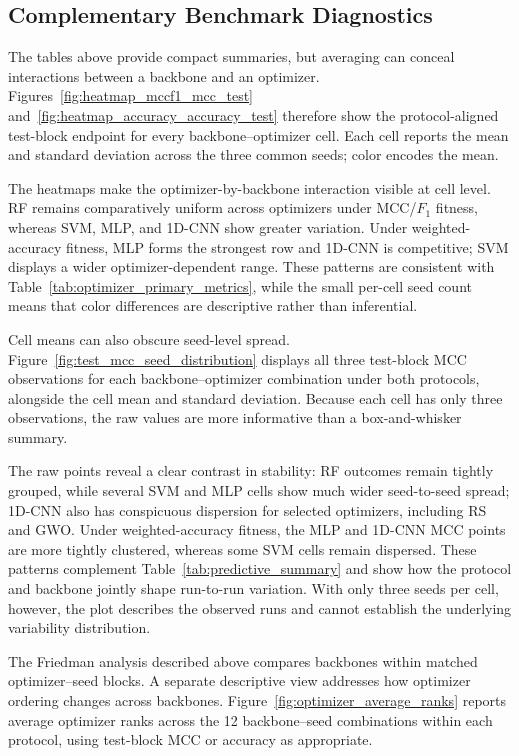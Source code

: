 \subsection{Complementary Benchmark Diagnostics}
\label{sec:benchmark_diagnostics}

The tables above provide compact summaries, but averaging can conceal interactions between a backbone and an optimizer. Figures~\ref{fig:heatmap_mccf1_mcc_test} and~\ref{fig:heatmap_accuracy_accuracy_test} therefore show the protocol-aligned test-block endpoint for every backbone--optimizer cell. Each cell reports the mean and standard deviation across the three common seeds; color encodes the mean.

The heatmaps make the optimizer-by-backbone interaction visible at cell level. RF remains comparatively uniform across optimizers under MCC/$F_1$ fitness, whereas SVM, MLP, and 1D-CNN show greater variation. Under weighted-accuracy fitness, MLP forms the strongest row and 1D-CNN is competitive; SVM displays a wider optimizer-dependent range. These patterns are consistent with Table~\ref{tab:optimizer_primary_metrics}, while the small per-cell seed count means that color differences are descriptive rather than inferential.

Cell means can also obscure seed-level spread. Figure~\ref{fig:test_mcc_seed_distribution} displays all three test-block MCC observations for each backbone--optimizer combination under both protocols, alongside the cell mean and standard deviation. Because each cell has only three observations, the raw values are more informative than a box-and-whisker summary.

The raw points reveal a clear contrast in stability: RF outcomes remain tightly grouped, while several SVM and MLP cells show much wider seed-to-seed spread; 1D-CNN also has conspicuous dispersion for selected optimizers, including RS and GWO. Under weighted-accuracy fitness, the MLP and 1D-CNN MCC points are more tightly clustered, whereas some SVM cells remain dispersed. These patterns complement Table~\ref{tab:predictive_summary} and show how the protocol and backbone jointly shape run-to-run variation. With only three seeds per cell, however, the plot describes the observed runs and cannot establish the underlying variability distribution.

The Friedman analysis described above compares backbones within matched optimizer--seed blocks. A separate descriptive view addresses how optimizer ordering changes across backbones. Figure~\ref{fig:optimizer_average_ranks} reports average optimizer ranks across the 12 backbone--seed combinations within each protocol, using test-block MCC or accuracy as appropriate.



